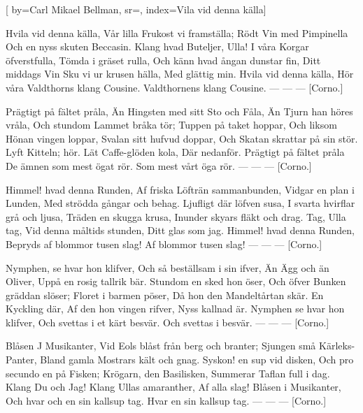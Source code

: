 

[ 		%
	by={Carl Mikael Bellman},					%
	sr={},					%
	index={Vila vid denna källa}]						%
	

\beginverse*						%
Hvila vid denna källa,
Vår lilla Frukost vi framställa;
Rödt Vin med Pimpinella
Och en nyss skuten Beccasin.
Klang hvad Buteljer, Ulla!
I våra Korgar öfverstfulla,
Tömda i gräset rulla,
Och känn hvad ångan dunstar fin,
Ditt middags Vin
Sku vi ur krusen hälla,
Med glättig min.
Hvila vid denna källa,
Hör våra Valdthorns klang Cousine.
Valdthornens klang Cousine. — — — [Corno.]
\endverse							%


\beginverse*						%
Prägtigt på fältet pråla,
Än Hingsten med sitt Sto och Fåla,
Än Tjurn han höres vråla,
Och stundom Lammet bråka tör;
Tuppen på taket hoppar,
Och liksom Hönan vingen loppar,
Svalan sitt hufvud doppar,
Och Skatan skrattar på sin stör.
Lyft Kitteln; hör.
Lät Caffe-glöden kola,
Där nedanför.
Prägtigt på fältet pråla
De ämnen som mest ögat rör.
Som mest vårt öga rör. — — — [Corno.]
\endverse							%

\beginverse*						%
Himmel! hvad denna Runden,
Af friska Löfträn sammanbunden,
Vidgar en plan i Lunden,
Med strödda gångar och behag.
Ljufligt där löfven susa,
I svarta hvirflar grå och ljusa,
Träden en skugga krusa,
Inunder skyars fläkt och drag.
Tag, Ulla tag,
Vid denna måltids stunden,
Ditt glas som jag.
Himmel! hvad denna Runden,
Bepryds af blommor tusen slag!
Af blommor tusen slag! — — — [Corno.]
\endverse							%


\beginverse*						%
Nymphen, se hvar hon klifver,
Och så beställsam i sin ifver,
Än Ägg och än Oliver,
Uppå en rosig tallrik bär.
Stundom en sked hon öser,
Och öfver Bunken gräddan slöser;
Floret i barmen pöser,
Då hon den Mandeltårtan skär.
En Kyckling där,
Af den hon vingen rifver,
Nyss kallnad är.
Nymphen se hvar hon klifver,
Och svettas i et kärt besvär.
Och svettas i besvär. — — — [Corno.]
\endverse							%

\beginverse*						%
Blåsen J Musikanter,
Vid Eols blåst från berg och branter;
Sjungen små Kärleks-Panter,
Bland gamla Mostrars kält och gnag.
Syskon! en sup vid disken,
Och pro secundo en på Fisken;
Krögarn, den Basilisken,
Summerar Taflan full i dag.
Klang Du och Jag!
Klang Ullas amaranther,
Af alla slag!
Blåsen i Musikanter,
Och hvar och en sin kallsup tag.
Hvar en sin kallsup tag. — — — [Corno.]
\endverse							%

